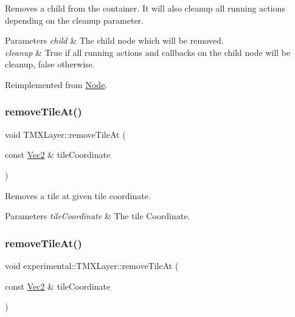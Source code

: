 Removes a child from the container. It will also cleanup all running actions depending on the cleanup parameter.


\begin{DoxyParams}{Parameters}
{\em child} & The child node which will be removed. \\
\hline
{\em cleanup} & True if all running actions and callbacks on the child node will be cleanup, false otherwise. \\
\hline
\end{DoxyParams}


Reimplemented from \hyperlink{classNode_a872d4a7d389b26b0c6ad7ed99c8b1b65}{Node}.

\mbox{\label{classexperimental_1_1TMXLayer_a185ae1ff2a7ce7069e67362fb1faa930}} 
\subsubsection{\texorpdfstring{remove\+Tile\+At()}{removeTileAt()}\hspace{0.1cm}{\footnotesize\ttfamily [1/2]}}
{\footnotesize\ttfamily void T\+M\+X\+Layer\+::remove\+Tile\+At (\begin{DoxyParamCaption}\item[{const \hyperlink{classVec2}{Vec2} \&}]{tile\+Coordinate }\end{DoxyParamCaption})}

Removes a tile at given tile coordinate.


\begin{DoxyParams}{Parameters}
{\em tile\+Coordinate} & The tile Coordinate. \\
\hline
\end{DoxyParams}
\mbox{\label{classexperimental_1_1TMXLayer_a949df39d466a6de9bdfc4abe3cb62651}} 
\subsubsection{\texorpdfstring{remove\+Tile\+At()}{removeTileAt()}\hspace{0.1cm}{\footnotesize\ttfamily [2/2]}}
{\footnotesize\ttfamily void experimental\+::\+T\+M\+X\+Layer\+::remove\+Tile\+At (\begin{DoxyParamCaption}\item[{const \hyperlink{classVec2}{Vec2} \&}]{tile\+Coordinate }\end{DoxyParamCaption})}

